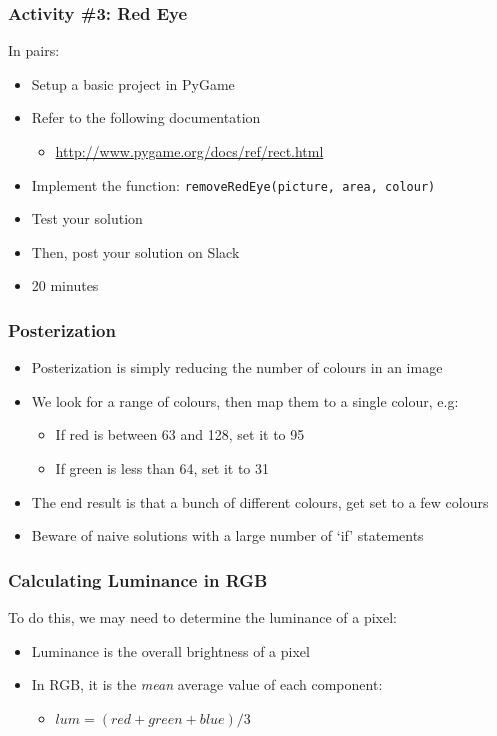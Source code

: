 \begin{frame}
	\frametitle{Activity \#3: Red Eye}
	
	In pairs:
	
	\vspace{2em}
	
	\begin{itemize}		
		\item Setup a basic project in PyGame
		\item Refer to the following documentation
		\begin{itemize}
			\item \url{http://www.pygame.org/docs/ref/rect.html}
		\end{itemize}
		\item Implement the function: \texttt{removeRedEye(picture, area, colour)}
		\item Test your solution
		\item Then, post your solution on Slack
		\item 20 minutes
	\end{itemize}
\end{frame}


\begin{frame}
	\frametitle{Posterization}
	
	\begin{itemize}		
		\item Posterization is simply reducing the number of colours in an image
		\item We look for a range of colours, then map them to a single colour, e.g:
		\begin{itemize}
			\item If red is between 63 and 128, set it to 95
			\item If green is less than 64, set it to 31
		\end{itemize}	
		\item The end result is that a bunch of different colours, get set to a few colours
		\item Beware of naive solutions with a large number of `if' statements
	\end{itemize}
\end{frame}


\begin{frame}
	\frametitle{Calculating Luminance in RGB}
	
	To do this, we may need to determine the luminance of a pixel:
	
	\begin{itemize}		
		\item Luminance is the overall brightness of a pixel
		\item In RGB, it is the \textit{mean} average value of each component:
		\begin{itemize}
			\item $lum = (red + green + blue) / 3$
		\end{itemize}	
	\end{itemize}
\end{frame}



